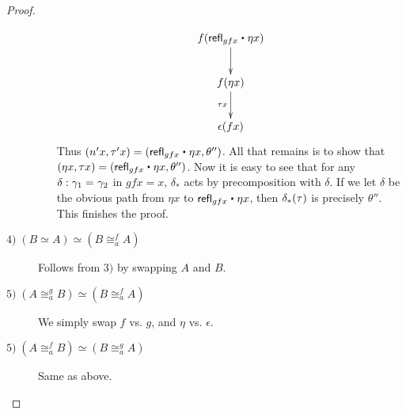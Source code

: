 \begin{proof}
\begin{description}
\begin{enumerate}
\begin{align*}
\xymatrix{
f(\refl{gfx} \ct \eta x) \ar[d] \\
f(\eta x) \ar[d] _{\tau x} \\
\epsilon (f x)}
\end{align*}
Thus $(n'x,\tau' x) = (\refl{gfx} \ct \eta x, \theta'')$. All that remains is to show that $(\eta x, \tau x) = (\refl{gfx} \ct \eta x, \theta'')$. Now it is easy to see that for any $\delta : \gamma_1 =_{} \gamma_2$ in $gfx = x$, $\delta_*$ acts by precomposition with $\delta$. If we let $\delta$ be the obvious path from $\eta x$ to $\refl{gfx} \ct \eta x$, then ${\delta}_{*}\!\left({\tau}\right)$ is precisely $\theta''$. This finishes the proof.
\end{enumerate}

\item[$\mathit{4)} \; (B \simeq A) \simeq (B \cong^f_a A)$] Follows from $\mathit{3)}$ by swapping $A$ and $B$.

\item[$\mathit{5)} \; (A \cong^g_a B) \simeq (B \cong^f_a A)$] We simply swap $f$ vs. $g$, and $\eta$ vs. $\epsilon$.

\item[$\mathit{5)} \; (A \cong^f_a B) \simeq (B \cong^g_a A)$] Same as above.

\end{description}
\end{proof}

